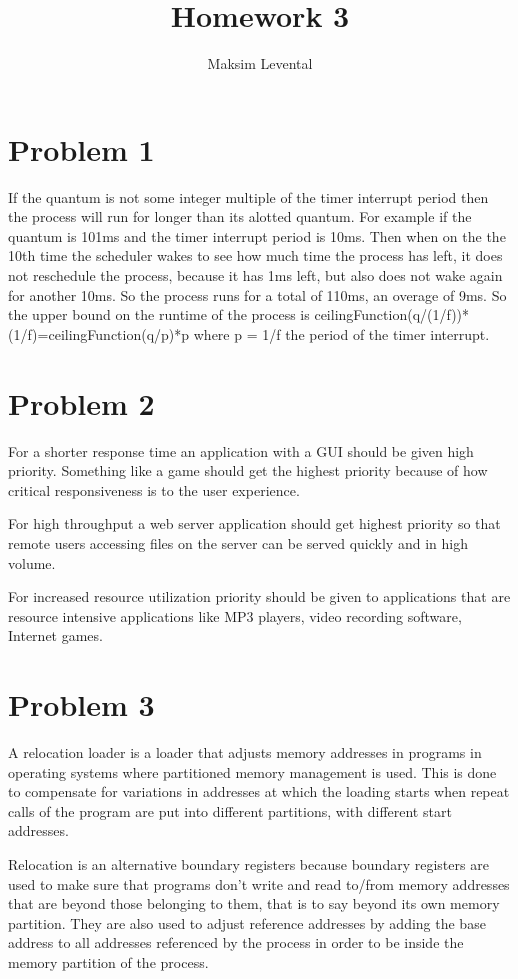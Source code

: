 \documentclass[11pt]{article} %
\title{Homework 3}
\author{Maksim Levental}
\begin{document}
\maketitle

\section*{Problem 1}
If the quantum is not some integer multiple of the timer interrupt period then the process will run for longer than its alotted quantum. For example if the quantum is 101ms and the timer interrupt period is 10ms. Then when on the the 10th time the scheduler wakes to see how much time the process has left, it does not reschedule the process, because it has 1ms left, but also does not wake again for another 10ms. So the process runs for a total of 110ms, an overage of 9ms. So the upper bound on the runtime of the process is ceilingFunction(q/(1/f))*(1/f)=ceilingFunction(q/p)*p where p = 1/f the period of the timer interrupt.

\section*{Problem 2}
For a shorter response time an application with a GUI should be given high priority. Something like a game should get the highest priority because of how critical responsiveness is to the user experience.

For high throughput a web server application should get highest priority so that remote users accessing files on the server can be served quickly and in high volume.

For increased resource utilization priority should be given to applications that are resource intensive applications like MP3 players, video recording software, Internet games.
\section*{Problem 3}

A relocation loader is a loader that adjusts memory addresses in programs in operating systems where partitioned memory management is used. This is done to compensate for variations in addresses at which the loading starts when repeat calls of the program are put into different partitions, with different start addresses. 

Relocation is an alternative boundary registers because boundary registers are used to make sure that programs don't write and read to/from memory addresses that are beyond those belonging to them, that is to say beyond its own memory partition. They are also used to adjust reference addresses by adding the base address to all addresses referenced by the process in order to be inside the memory partition of the process.
\end{document}
